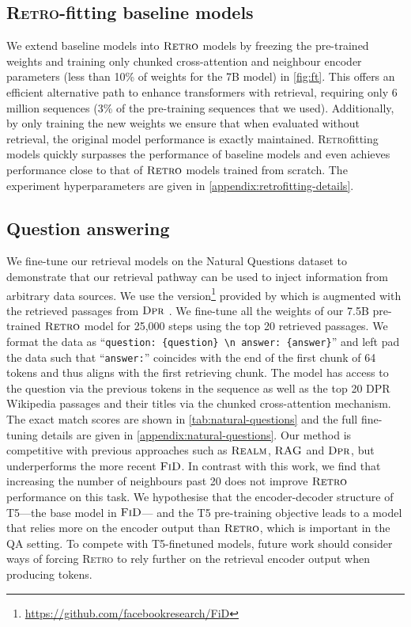 \subsection{\textsc{Retro}-fitting baseline models}
\label{subsec:ft}
We extend baseline models into $\textsc{Retro}$ models by freezing the pre-trained weights and training only chunked cross-attention and neighbour encoder parameters (less than 10\% of weights for the 7B model) in \autoref{fig:ft}. 
This offers an efficient alternative path to enhance transformers with retrieval, requiring only 6 million sequences (3\% of the pre-training sequences that we used). Additionally, by only training the new weights we ensure that when evaluated without retrieval, the original model performance is exactly maintained.
\textsc{Retro}fitting models quickly surpasses the performance of baseline models and even achieves performance close to that of $\textsc{Retro}$ models trained from scratch. The experiment hyperparameters are given in \autoref{appendix:retrofitting-details}.

\subsection{Question answering}
\label{subsection-qa}
We fine-tune our retrieval models on the Natural Questions \citep{naturalquestions} dataset to demonstrate that our retrieval pathway can be used to inject information from arbitrary data sources. We use the version\footnote{\url{https://github.com/facebookresearch/FiD}} provided by \cite{izacard2020leveraging} which is augmented with the retrieved passages from $\textsc{Dpr}$ \citep{karpukhin2020dense}. We fine-tune all the weights of our 7.5B pre-trained $\textsc{Retro}$ model for 25,000 steps using the top 20 retrieved passages. We format the data as  ``\texttt{question: \{question\} \textbackslash{}n\,answer: \{answer\}}'' and left pad the data such that ``\texttt{answer:}'' coincides with the end of the first chunk of 64 tokens and thus aligns with the first retrieving chunk. The model has access to the question via the previous tokens in the sequence as well as the top 20 DPR Wikipedia passages and their titles via the chunked cross-attention mechanism. The exact match scores are shown in \autoref{tab:natural-questions} and the full fine-tuning details are given in \autoref{appendix:natural-questions}.
Our method is competitive with previous approaches such as $\textsc{Realm}$, $\textsc{RAG}$ and $\textsc{Dpr}$, but underperforms the more recent $\textsc{FiD}$. In contrast with this work, we find that increasing the number of neighbours past 20 does not improve $\textsc{Retro}$ performance on this task. We hypothesise that the encoder-decoder structure of T5---the base model in $\textsc{FiD}$--- and the T5 pre-training objective leads to a model that relies more on the encoder output than $\textsc{Retro}$, which is important in the QA setting. To compete with T5-finetuned models, future work should consider ways of forcing \textsc{Retro} to rely further on the retrieval encoder output when producing tokens.

